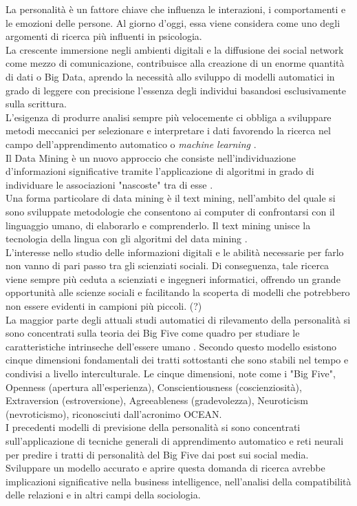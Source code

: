 La personalità è un fattore chiave che influenza le interazioni, i comportamenti e le emozioni delle persone. Al giorno d'oggi, essa viene considera come uno degli argomenti di ricerca più influenti in psicologia.
\\
La crescente immersione negli ambienti digitali e la diffusione dei social network come mezzo di comunicazione, contribuisce alla creazione di un enorme quantità di dati o Big Data, aprendo la necessità allo sviluppo di modelli automatici in grado di leggere con precisione l'essenza degli individui basandosi esclusivamente sulla scrittura.
\\
L'esigenza di produrre analisi sempre più velocemente ci obbliga a sviluppare metodi meccanici per selezionare e interpretare i dati favorendo la ricerca nel campo dell'apprendimento automatico o \emph{machine learning} \cite{samuel1959some}.
\\
Il Data Mining è un nuovo approccio che consiste nell'individuazione d’informazioni significative tramite l'applicazione di algoritmi in grado di individuare le associazioni "nascoste" tra di esse  \cite{chakrabarti2006data,franklin2005elements}. 
\\
Una forma particolare di data mining è il text mining, nell'ambito del quale si sono sviluppate metodologie che consentono ai computer di confrontarsi con il linguaggio umano, di elaborarlo e comprenderlo. Il text mining unisce la tecnologia della lingua con gli algoritmi del data mining  \cite{tan1999text}.
\\
L'interesse nello studio delle informazioni digitali e le abilità necessarie per farlo non vanno di pari passo tra gli scienziati sociali. Di conseguenza, tale ricerca viene sempre più ceduta a scienziati e ingegneri informatici, offrendo un grande opportunità alle scienze sociali e facilitando la scoperta di modelli che potrebbero non essere evidenti in campioni più piccoli. (?)
\\
La maggior parte degli attuali studi automatici di rilevamento della personalità si sono concentrati sulla teoria dei Big Five come quadro per studiare le caratteristiche intrinseche dell'essere umano \cite{barrick1991big}.
Secondo questo modello esistono cinque dimensioni fondamentali dei tratti sottostanti che sono stabili nel tempo e condivisi a livello interculturale. Le cinque dimensioni, note come i "Big Five", Openness (apertura all'esperienza), Conscientiousness (coscienziosità), Extraversion (estroversione), Agreeableness (gradevolezza), Neuroticism (nevroticismo), riconosciuti dall'acronimo OCEAN.
\\
I precedenti modelli di previsione della personalità si sono concentrati sull'applicazione di tecniche generali di apprendimento automatico e reti neurali per predire i tratti di personalità del Big Five dai post sui social media. 
\\
Sviluppare un modello accurato e aprire questa domanda di ricerca avrebbe implicazioni significative nella business intelligence, nell'analisi della compatibilità delle relazioni e in altri campi della sociologia.

